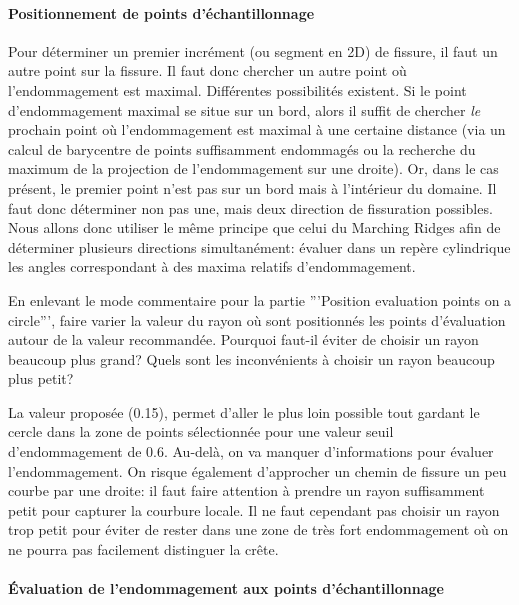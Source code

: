 \documentclass[french,12pt]{exam}
\begin{document}
\begin{questions}
{\paragraph{Positionnement de points d'échantillonnage\\}
Pour déterminer un premier incrément (ou segment en 2D) de fissure, il faut un autre point sur la fissure. Il faut donc chercher un autre point où l'endommagement est maximal. Différentes possibilités existent. Si le point d'endommagement maximal se situe sur un bord, alors il suffit de chercher \emph{le} prochain point où l'endommagement est maximal à une certaine distance (via un calcul de barycentre de points suffisamment endommagés ou la recherche du maximum de la projection de l'endommagement sur une droite). Or, dans le cas présent, le premier point n'est pas sur un bord mais à l'intérieur du domaine. Il faut donc déterminer non pas une, mais deux direction de fissuration possibles. Nous allons donc utiliser le même principe que celui du Marching Ridges afin de déterminer plusieurs directions simultanément: évaluer dans un repère cylindrique les angles correspondant à des maxima relatifs d'endommagement.}

\question En enlevant le mode commentaire pour la partie '''Position evaluation points on a circle''', faire varier la valeur du rayon où sont positionnés les points d'évaluation autour de la valeur recommandée. Pourquoi faut-il éviter de choisir un rayon beaucoup plus grand? Quels sont les inconvénients à choisir un rayon beaucoup plus petit?
\begin{solution}
La valeur proposée (0.15), permet d'aller le plus loin possible tout gardant le cercle dans la zone de points sélectionnée pour une valeur seuil d'endommagement de 0.6. Au-delà, on va manquer d'informations pour évaluer l'endommagement. On risque également d'approcher un chemin de fissure un peu courbe par une droite: il faut faire attention à prendre un rayon suffisamment petit pour capturer la courbure locale. Il ne faut cependant pas choisir un rayon trop petit pour éviter de rester dans une zone de très fort endommagement où on ne pourra pas facilement distinguer la crête.
\end{solution}

\paragraph{Évaluation de l'endommagement aux points d'échantillonnage\\}\label{par:evaluation_damage}


\end{questions}
\end{document}
